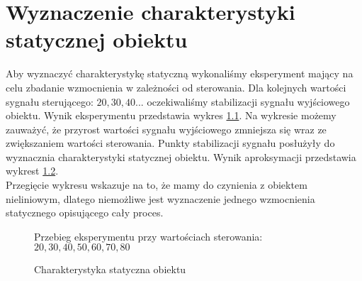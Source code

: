 \chapter{Wyznaczenie charakterystyki statycznej obiektu}
\label{lab2}

Aby wyznaczyć charakterystykę statyczną wykonaliśmy eksperyment mający na celu zbadanie wzmocnienia w zależności od sterowania. Dla kolejnych wartości sygnału sterującego: $20, 30, 40...$ oczekiwaliśmy stabilizacji sygnału wyjściowego obiektu. Wynik eksperymentu przedstawia wykres \ref{eksperyment}. Na wykresie możemy zauważyć, że przyrost wartości sygnału wyjściowego zmniejsza się wraz ze zwiększaniem wartości sterowania. Punkty stabilizacji sygnału posłużyły do wyznacznia charakterystyki statycznej obiektu. Wynik aproksymacji przedstawia wykrest \ref{char_stat}.\\
\indent{} Przegięcie wykresu wskazuje na to, że mamy do czynienia z obiektem nieliniowym, dlatego niemożliwe jest wyznaczenie jednego wzmocnienia statycznego 
opisującego cały proces.

\begin{figure}[b]
    \centering
    \caption{Przebieg eksperymentu przy wartościach sterowania: $20, 30, 40, 50, 60, 70, 80$}
    \label{eksperyment}
\end{figure}

\begin{figure}[t]
    \centering
    \caption{Charakterystyka statyczna obiektu}
    \label{char_stat}
\end{figure}
